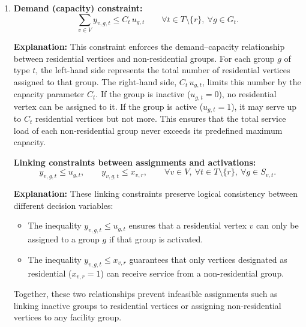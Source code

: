 \documentclass[12pt,a4paper]{article}
\begin{document}
\begin{enumerate}
\textbf{Explanation:}  
This equality enforces that every residential vertex $v$ must be assigned to exactly one
active group $g$ of each non-residential type $t$.
If $x_{v,r}=1$, the vertex must appear in one and only one assignment $y_{v,g,t}=1$.
If $x_{v,r}=0$, no assignment can exist for that vertex.
This ensures that each residential container receives full coverage
and activates the relevant demand and capacity constrain

\item \textbf{Demand (capacity) constraint:}
\[
\sum_{v \in V} y_{v,g,t} \le C_t \, u_{g,t}
\qquad
\forall t \in T \setminus \{r\},\ \forall g \in G_t.
\]

\textbf{Explanation:}  
This constraint enforces the demand–capacity relationship between residential vertices and
non-residential groups.  
For each group $g$ of type $t$, the left-hand side represents the total number of residential vertices
assigned to that group.  
The right-hand side, $C_t \, u_{g,t}$, limits this number by the capacity parameter $C_t$.
If the group is inactive ($u_{g,t}=0$), no residential vertex can be assigned to it.
If the group is active ($u_{g,t}=1$), it may serve up to $C_t$ residential vertices but not more.
This ensures that the total service load of each non-residential group
never exceeds its predefined maximum capacity.

\vspace{1em}

\textbf{Linking constraints between assignments and activations:}
\[
y_{v,g,t} \le u_{g,t},
\qquad
y_{v,g,t} \le x_{v,r},
\qquad
\forall v \in V,\ \forall t \in T \setminus \{r\},\ \forall g \in S_{v,t}.
\]

\textbf{Explanation:}  
These linking constraints preserve logical consistency between different decision variables:
\begin{itemize}
    \item The inequality $y_{v,g,t} \le u_{g,t}$ ensures that a residential vertex $v$ can only be assigned
    to a group $g$ if that group is activated.
    \item The inequality $y_{v,g,t} \le x_{v,r}$ guarantees that only vertices designated as residential
    ($x_{v,r}=1$) can receive service from a non-residential group.
\end{itemize}
Together, these two relationships prevent infeasible assignments such as
linking inactive groups to residential vertices or assigning non-residential vertices
to any facility group.


\end{enumerate}
\end{document}
